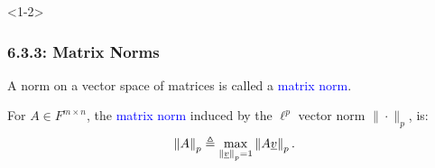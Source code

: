 \documentclass[10pt,english,aspectratio=169]{beamer}
\begin{document}
\begin{frame}<1-2> \frametitle{6.3.3: Matrix Norms}

A norm on a vector space of matrices is called a \textcolor{blue}{matrix norm}.

\begin{definition}
For $A\in F^{m\times n}$, the \textcolor{blue}{matrix norm} induced by the $\ell^p$ vector norm $\|\cdot\|_p$,  is:
\[ \left\| A \right\|_p \triangleq \max_{\left\| \underline{v} \right\|_p = 1} \left\| A \underline{v} \right\|_p. \]
\end{definition}


\end{frame}

\newcommand*{\vertbar}{\rule[-1ex]{0.5pt}{2.5ex}}
\end{document}
